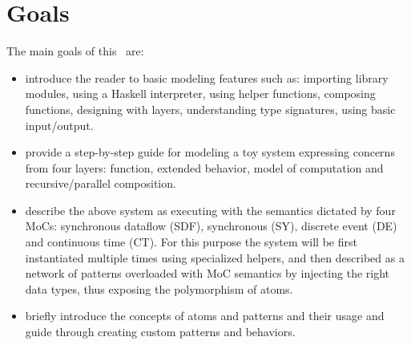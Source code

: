 
\section{Goals}
\label{sec:getting-started:goals}

The main goals of this \SelfRef\ are:
\begin{itemize}
\item introduce the reader to basic modeling features such as: importing library modules, using a Haskell interpreter, using helper functions, composing functions, designing with layers, understanding type signatures, using basic input/output.
\item provide a step-by-step guide for modeling a toy system expressing concerns from four layers: function, extended behavior, model of computation and recursive/parallel composition. 
\item describe the above system as executing with the semantics dictated by four MoCs: synchronous dataflow (SDF), synchronous (SY), discrete event (DE) and continuous time (CT). For this purpose the system will be first instantiated multiple times using specialized helpers, and then described as a network of patterns overloaded with MoC semantics by injecting the right data types, thus exposing the polymorphism of atoms. 
\item briefly introduce the concepts of atoms and patterns and their usage and guide through creating custom patterns and behaviors.
\end{itemize}


